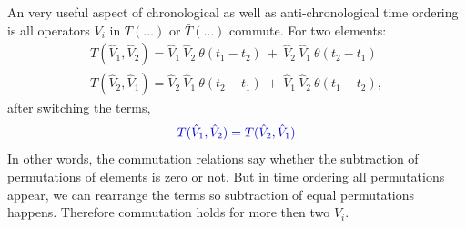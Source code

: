 \documentclass[12pt, titlepage]{article}
\begin{document}
\begin{subappendices}
An very useful aspect of chronological as well as anti-chronological time ordering is all operators $ V_i $ in $ T(\ldots) $ or $ \bar{T}(\ldots) $ commute. For two elements:
\begin{subequations}
\begin{align}
T(\hat{V}_1, \hat{V}_2)=\hat{V}_1\ \hat{V}_2\ \theta (t_1 -t_2)\ +\ \hat{V}_2\  \hat{V}_1 \ \theta (t_2-t_1)
\\
T(\hat{V}_2, \hat{V}_1)=\hat{V}_2\ \hat{V}_1\ \theta (t_2 -t_1)\ +\ \hat{V}_1\  \hat{V}_2 \ \theta (t_1-t_2)
,
\end{align}
\end{subequations}
after switching the terms,
\begin{equation}\textcolor[RGB]{0,0,204}{
T(\hat{V}_1, \hat{V}_2)=T(\hat{V}_2, \hat{V}_1)
}
\end{equation}
In other words, the commutation relations say whether the subtraction of permutations of elements is zero or not. But in time ordering all permutations appear, we can rearrange the terms so subtraction of equal permutations happens. Therefore commutation holds for more then two $ V_i $.

\end{subappendices}
\end{document}

